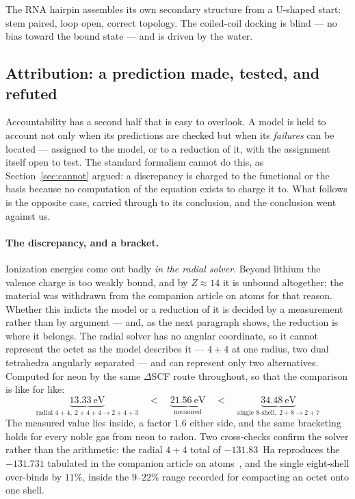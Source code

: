 \documentclass[11pt]{article}
\begin{document}
The RNA hairpin assembles its own secondary structure from a U-shaped start: stem paired, loop
open, correct topology. The coiled-coil docking is blind --- no bias toward the bound state ---
and is driven by the water.

\subsection{Attribution: a prediction made, tested, and refuted}\label{sec:attrib}

Accountability has a second half that is easy to overlook. A model is held to account not only when
its predictions are checked but when its \emph{failures} can be located --- assigned to the model,
or to a reduction of it, with the assignment itself open to test. The standard formalism cannot do
this, as Section~\ref{sec:cannot} argued: a discrepancy is charged to the functional or the basis
because no computation of the equation exists to charge it to. What follows is the opposite case,
carried through to its conclusion, and the conclusion went against us.

\paragraph{The discrepancy, and a bracket.} Ionization energies come out badly \emph{in the
radial solver}. Beyond lithium the valence charge is too weakly bound, and by $Z \approx 14$ it is
unbound altogether; the material was withdrawn from the companion article on atoms for that reason.
Whether this indicts the model or a reduction of it is decided by a measurement rather than by
argument --- and, as the next paragraph shows, the reduction is where it belongs. The
radial solver has no angular coordinate, so it cannot represent the octet as the model describes
it --- $4{+}4$ at one radius, two dual tetrahedra angularly separated --- and can represent only
two alternatives. Computed for neon by the same $\Delta$SCF route throughout, so that the
comparison is like for like:
\[
\underbrace{13.33\ \mathrm{eV}}_{\text{radial } 4+4,\ 2+4+4 \to 2+4+3}
\quad < \quad
\underbrace{21.56\ \mathrm{eV}}_{\text{measured}}
\quad < \quad
\underbrace{34.48\ \mathrm{eV}}_{\text{single 8-shell},\ 2+8 \to 2+7}
\]
The measured value lies inside, a factor $1.6$ either side, and the same bracketing holds for every
noble gas from neon to radon. Two cross-checks confirm the solver rather than the arithmetic: the
radial $4{+}4$ total of $-131.83$~Ha reproduces the $-131.731$ tabulated in the companion article on atoms~\cite{Johnson-atoms}, and the single
eight-shell over-binds by $11\%$, inside the $9$--$22\%$ range recorded for compacting an octet onto
one shell.
\end{document}
